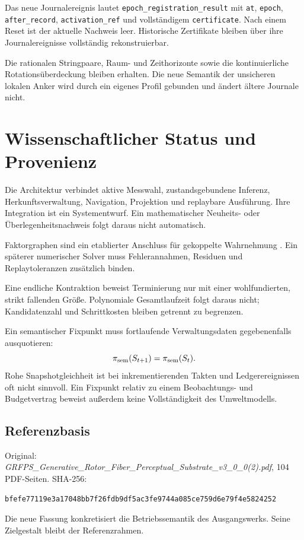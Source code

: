 \documentclass[11pt,a4paper]{article}
\newcommand{\nextsection}[2]{\clearpage{\color{accent}\small\textsf{#1}}\section{#2}}
\begin{document}
Das neue Journalereignis lautet
\texttt{epoch\_registration\_result} mit \texttt{at},
\texttt{epoch}, \texttt{after\_record}, \texttt{activation\_ref}
und vollständigem \texttt{certificate}. Nach einem Reset ist der
aktuelle Nachweis leer. Historische Zertifikate bleiben über ihre
Journalereignisse vollständig rekonstruierbar.

Die rationalen Stringpaare, Raum- und Zeithorizonte sowie die
kontinuierliche Rotationsüberdeckung bleiben erhalten. Die neue
Semantik der unsicheren lokalen Anker wird durch ein eigenes
Profil gebunden und ändert ältere Journale nicht.

\nextsection{ANHANG C / ANSPRÜCHE}{Wissenschaftlicher Status und Provenienz}
Die Architektur verbindet aktive Messwahl, zustandsgebundene
Inferenz, Herkunftsverwaltung, Navigation, Projektion und replaybare
Ausführung. Ihre Integration ist ein Systementwurf. Ein mathematischer
Neuheits- oder Überlegenheitsnachweis folgt daraus nicht automatisch.

Faktorgraphen sind ein etablierter Anschluss für gekoppelte
Wahrnehmung \cite{factorgraphs}. Ein späterer numerischer Solver
muss Fehlerannahmen, Residuen und Replaytoleranzen zusätzlich binden.

Eine endliche Kontraktion beweist Terminierung nur mit einer
wohlfundierten, strikt fallenden Größe. Polynomiale Gesamtlaufzeit
folgt daraus nicht; Kandidatenzahl und Schrittkosten bleiben getrennt zu begrenzen.

Ein semantischer Fixpunkt muss fortlaufende Verwaltungsdaten
gegebenenfalls ausquotieren:
\[
\pi_{\rm sem}(S_{t+1})=\pi_{\rm sem}(S_t).
\]
Rohe Snapshotgleichheit ist bei inkrementierenden Takten und
Ledgerereignissen oft nicht sinnvoll. Ein Fixpunkt relativ zu einem
Beobachtungs- und Budgetvertrag beweist außerdem keine
Vollständigkeit des Umweltmodells.

\subsection*{Referenzbasis}
Original: \emph{GRFPS\_Generative\_Rotor\_Fiber\_Perceptual\_Substrate\_v3\_0\_0(2).pdf},
104 PDF-Seiten. SHA-256:
\begin{lstlisting}
bfefe77119e3a17048bb7f26fdb9df5ac3fe9744a085ce759d6e79f4e5824252
\end{lstlisting}
Die neue Fassung konkretisiert die Betriebssemantik des Ausgangswerks.
Seine Zielgestalt bleibt der Referenzrahmen.
\end{document}

